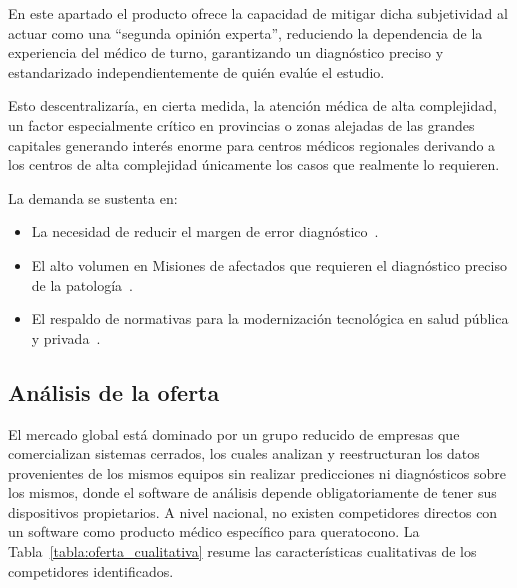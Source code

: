             En este apartado el producto ofrece la capacidad de mitigar dicha subjetividad al actuar como una ``segunda opinión experta'', reduciendo la dependencia de la experiencia del médico de turno, garantizando un diagnóstico preciso y estandarizado independientemente de quién evalúe el estudio.
            
            Esto descentralizaría, en cierta medida, la atención médica de alta complejidad, un factor especialmente crítico en provincias o zonas alejadas de las grandes capitales generando interés enorme para centros médicos regionales derivando a los centros de alta complejidad únicamente los casos que realmente lo requieren. 
            
            La demanda se sustenta en:
            
            \begin{itemize}
                \item La necesidad de reducir el margen de error diagnóstico~.
                
                \item El alto volumen en Misiones de afectados que requieren el diagnóstico preciso de la patología~.  
                
                \item El respaldo de normativas para la modernización tecnológica en salud pública y privada~.
            \end{itemize}

        \subsection{Análisis de la oferta}

            El mercado global está dominado por un grupo reducido de empresas que comercializan sistemas cerrados, los cuales analizan y reestructuran los datos provenientes de los mismos equipos sin realizar predicciones ni diagnósticos sobre los mismos, donde el software de análisis depende obligatoriamente de tener sus dispositivos propietarios. A nivel nacional, no existen competidores directos con un software como producto médico específico para queratocono. La Tabla~\ref{tabla:oferta_cualitativa} resume las características cualitativas de los competidores identificados.

